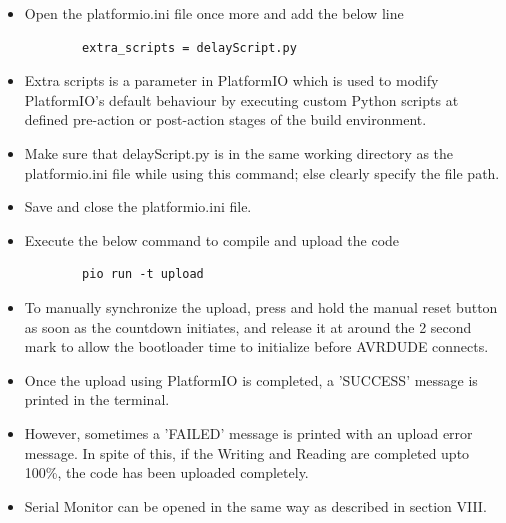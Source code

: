 \documentclass[conference]{IEEEtran} %
\begin{document}
\begin{itemize}
    \item Open the platformio.ini file once more and add the below line
    \begin{lstlisting}
        extra_scripts = delayScript.py
    \end{lstlisting}
    \item Extra scripts is a parameter in PlatformIO which is used to modify PlatformIO's default behaviour by executing custom Python scripts at defined pre-action or post-action stages of the build environment. 
    \item Make sure that delayScript.py is in the same working directory as the platformio.ini file while using this command; else clearly specify the file path. 
    \item Save and close the platformio.ini file. 
    
    \item Execute the below command to compile and upload the code
    \begin{lstlisting}
        pio run -t upload
    \end{lstlisting}
    \item To manually synchronize the upload, press and hold the manual reset button as soon as the countdown initiates, and release it at around the 2 second mark to allow the bootloader time to initialize before AVRDUDE connects.
    \item Once the upload using PlatformIO is completed, a 'SUCCESS' message is printed in the terminal. 
    \item However, sometimes a 'FAILED' message is printed with an upload error message. In spite of this, if the Writing and Reading are completed upto 100\%, the code has been uploaded completely.
    \item Serial Monitor can be opened in the same way as described in section VIII. 
\end{itemize}

\end{document}
